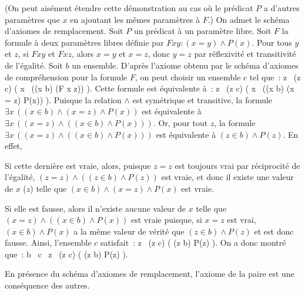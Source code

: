 \noindent{} 
    (On peut aisément étendre cette démonstration au cas où le prédicat $P$ a d'autres paramètres que $x$ en ajoutant les mêmes paramètres à $F$.)
    On admet le schéma d'axiomes de remplacement. 
    Soit $P$ un prédicat à un paramètre libre. 
    Soit $F$ la formule à deux paramètres libres définie par $F x y : (x = y) \wedge P(x)$. 
    Pour tous $y$ et $z$, si $F x y$ et $F x z$, alors $x = y$ et $x = z$, donc $y = z$ par réflexivité et transitivité de l'égalité.
    Soit $b$ un ensemble. 
    D'après l'axiome obtenu par le schéma d'axiomes de compréhension pour la formule $F$, on peut choisir un ensemble $c$ tel que : 
    \startformula
        \forall z \, (z \in c) \Leftrightarrow \left( \exists x \, ((x \in b) \wedge (F x z)) \right). 
    \stopformula
    Cette formule est équivalente à : 
    \startformula
        \forall z \, (z \in c) \Leftrightarrow \left( \exists x \, ((x \in b) \wedge (x = z) \wedge P(x)) \right). 
    \stopformula
    Puisque la relation $\wedge$ est symétrique et transitive, la formule $\exists x \, ((x \in b) \wedge (x = z) \wedge P(x))$ est équivalente à $\exists x \, ((x = z) \wedge  ((x \in b) \wedge P(x)))$.
    Or, pour tout $z$, la formule $\exists x \, ((x = z) \wedge ((x \in b) \wedge P(x)))$ est équivalente à $(z \in b) \wedge P(z)$.
    En effet, 
    \startitemize[nowhite]
        \item Si cette dernière est vraie, alors, puisque $z = z$ est toujours vrai par réciprocité de l'égalité, $(z = z) \wedge ((z \in b) \wedge P(z))$ est vraie, et donc il existe une valeur de $x$ ($z$) telle que $(x \in b) \wedge (x = z) \wedge P(x)$ est vraie. 
        \item Si elle est fausse, alors il n'existe aucune valeur de $x$ telle que $(x = z) \wedge ((x \in b) \wedge P(x))$ est vraie puisque, si $x = z$ est vrai, $(x \in b) \wedge P(x)$ a la même valeur de vérité que $(z \in b) \wedge P(z)$ et est donc fausse.
    \stopitemize
    Ainsi, l'ensemble $c$ satisfait : 
    \startformula
        \forall z \, (z \in c) \Leftrightarrow \left( (z \in b) \wedge P(z) \right). 
    \stopformula
    On a donc montré que :
    \startformula
        \forall b \, \exists c \, \forall z \, (z \in c) \Leftrightarrow \left( (z \in b) \wedge P(z) \right). 
    \stopformula

   \done 


\blank[medium]

\noindent{} En présence du schéma d'axiomes de remplacement, l'axiome de la paire est une conséquence des autres. 

